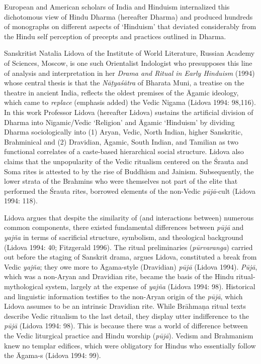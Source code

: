 European and American scholars of India and Hinduism internalized this dichotomous view of Hindu Dharma (hereafter Dharma) and produced hundreds of monographs on different aspects of ‘Hinduism’ that deviated considerably from the Hindu self perception of precepts and practices outlined in Dharma.

Sanskritist Natalia Lidova of the Institute of World Literature, Russian Academy of Sciences, Moscow, is one such Orientalist Indologist who presupposes this line of analysis and interpretation in her \textit{Drama and Ritual in Early Hinduism} (1994) whose central thesis is that the \textit{Nāṭyaśātra} of Bharata Muni, a treatise on the theatre in ancient India, reflects the oldest premises of the Āgamic ideology, which came to \textit{replace} (emphasis added) the Vedic Nigama (Lidova 1994: 98,116). In this work Professor Lidova (hereafter Lidova) sustains the artificial division of Dharma into Nigamic/Vedic ‘Religion’ and Āgamic ‘Hinduism’ by dividing Dharma sociologically into (1) Aryan, Vedic, North Indian, higher Sanskritic, Brahminical and (2) Dravidian, Āgamic, South Indian, and Tamilian as two functional correlates of a caste-based hierarchical social structure. Lidova also claims that the unpopularity of the Vedic ritualism centered on the Śrauta and Soma rites is attested to by the rise of Buddhism and Jainism. Subsequently, the lower strata of the Brahmins who were themselves not part of the elite that performed the Śrauta rites, borrowed elements of the non-Vedic \textit{pūjā}-cult (Lidova 1994: 118).

Lidova argues that despite the similarity of (and interactions between) numerous common components, there existed fundamental differences between \textit{pūjā} and \textit{yajña} in terms of sacrificial structure, symbolism, and theological background (Lidova 1994: 40; Fitzgerald 1996). The ritual preliminaries (\textit{pūrvaranga}) carried out before the staging of Sanskrit drama, argues Lidova, constituted a break from Vedic \textit{yajña}; they owe more to Āgama-style (Dravidian) \textit{pūjā} (Lidova 1994).\textit{ Pūjā}, which was a non-Aryan and Dravidian rite, became the basis of the Hindu ritual-mythological system, largely at the expense of \textit{yajña} (Lidova 1994: 98). Historical and linguistic information testifies to the non-Aryan origin of the\textit{ pūjā}, which Lidova assumes to be an intrinsic Dravidian rite. While Brāhmaṇa ritual texts describe Vedic ritualism to the last detail, they display utter indifference to the \textit{pūjā} (Lidova 1994: 98). This is because there was a world of difference between the Vedic liturgical practice and Hindu worship (\textit{pūjā}). Vedism and Brahmanism knew no templar edifices, which were obligatory for Hindus who essentially follow the Āgama-s (Lidova 1994: 99).

